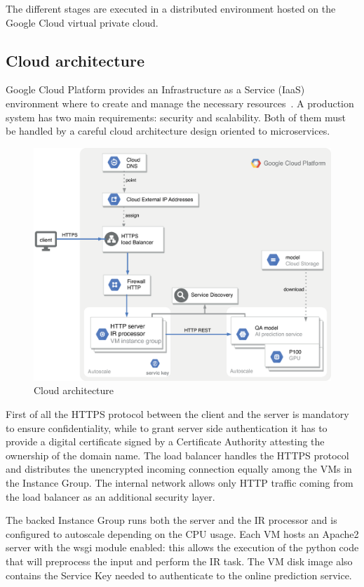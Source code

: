 \documentclass{article}
\begin{document}
The different stages are executed in a distributed environment hosted on the Google Cloud virtual private cloud.


\subsection{Cloud architecture}
Google Cloud Platform provides an Infrastructure as a Service (IaaS) environment where to create and manage the necessary resources~\cite{wikiCloud}.
A production system has two main requirements: security and scalability.
Both of them must be handled by a careful cloud architecture design oriented to microservices.

\begin{figure}[h]
\includegraphics[width=\textwidth]{cloud_square.eps}
\caption{Cloud architecture } \label{cloud_arch}
\end{figure}

First of all the HTTPS protocol between the client and the server is mandatory to ensure confidentiality, while to grant server side authentication it has to provide a digital certificate signed by a Certificate Authority attesting the ownership of the domain name. 
The load balancer handles the HTTPS protocol and distributes the unencrypted incoming connection equally among the VMs in the Instance Group. The internal network allows only HTTP traffic coming from the load balancer as an additional security layer.

The backed Instance Group runs both the server and the IR processor and is configured to autoscale depending on the CPU usage. 
Each VM hosts an Apache2 server with the wsgi module enabled: this allows the execution of the python code that will preprocess the input and perform the IR task. The VM disk image also contains the Service Key needed to authenticate to the online prediction service.
\end{document}
